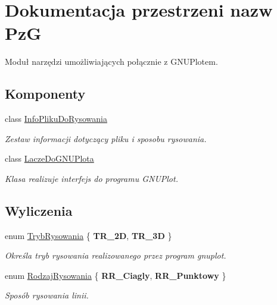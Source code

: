 \hypertarget{namespacePzG}{}\section{Dokumentacja przestrzeni nazw PzG}
\label{namespacePzG}


Moduł narzędzi umożliwiających połącznie z G\+N\+U\+Plotem.  


\subsection*{Komponenty}
\begin{DoxyCompactItemize}
\item 
class \hyperlink{classPzG_1_1InfoPlikuDoRysowania}{Info\+Pliku\+Do\+Rysowania}
\begin{DoxyCompactList}\small\item\em Zestaw informacji dotyczący pliku i sposobu rysowania. \end{DoxyCompactList}\item 
class \hyperlink{classPzG_1_1LaczeDoGNUPlota}{Lacze\+Do\+G\+N\+U\+Plota}
\begin{DoxyCompactList}\small\item\em Klasa realizuje interfejs do programu G\+N\+U\+Plot. \end{DoxyCompactList}\end{DoxyCompactItemize}
\subsection*{Wyliczenia}
\begin{DoxyCompactItemize}
\item 
enum \hyperlink{namespacePzG_aeedae1ef10c66d720f9e89de408ca4ca}{Tryb\+Rysowania} \{ {\bfseries T\+R\+\_\+2D}, 
{\bfseries T\+R\+\_\+3D}
 \}\begin{DoxyCompactList}\small\item\em Określa tryb rysowania realizowanego przez program {\ttfamily gnuplot}. \end{DoxyCompactList}
\item 
enum \hyperlink{namespacePzG_a705c92106f39b7d0c34a6739d10ff0b6}{Rodzaj\+Rysowania} \{ {\bfseries R\+R\+\_\+\+Ciagly}, 
{\bfseries R\+R\+\_\+\+Punktowy}
 \}\begin{DoxyCompactList}\small\item\em Sposób rysowania linii. \end{DoxyCompactList}
\end{DoxyCompactItemize}

